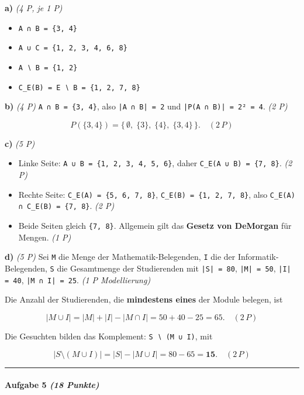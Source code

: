 \documentclass[11pt, a4paper]{article}
\begin{document}
\textbf{a)} \textit{(4 P, je 1 P)}

\begin{itemize}
  \item \texttt{A ∩ B = \{3, 4\}}
  \item \texttt{A ∪ C = \{1, 2, 3, 4, 6, 8\}}
  \item \texttt{A ∖ B = \{1, 2\}}
  \item \texttt{C\_E(B) = E ∖ B = \{1, 2, 7, 8\}}
\end{itemize}

\textbf{b)} \textit{(4 P)} \texttt{A ∩ B = \{3, 4\}}, also \texttt{|A ∩ B| = 2} und \texttt{|P(A ∩ B)| = 2² = 4}. \textit{(2 P)}

\[
P(\{3,4\}) = \{\,\emptyset,\; \{3\},\; \{4\},\; \{3, 4\}\,\}. \quad (2\,P)
\]


\textbf{c)} \textit{(5 P)}

\begin{itemize}
  \item Linke Seite: \texttt{A ∪ B = \{1, 2, 3, 4, 5, 6\}}, daher \texttt{C\_E(A ∪ B) = \{7, 8\}}. \textit{(2 P)}
  \item Rechte Seite: \texttt{C\_E(A) = \{5, 6, 7, 8\}}, \texttt{C\_E(B) = \{1, 2, 7, 8\}}, also \texttt{C\_E(A) ∩ C\_E(B) = \{7, 8\}}. \textit{(2 P)}
  \item Beide Seiten gleich \texttt{\{7, 8\}}. Allgemein gilt das \textbf{Gesetz von DeMorgan} für Mengen. \textit{(1 P)}
\end{itemize}

\textbf{d)} \textit{(5 P)} Sei \texttt{M} die Menge der Mathematik-Belegenden, \texttt{I} die der Informatik-Belegenden, \texttt{S} die Gesamtmenge der Studierenden mit \texttt{|S| = 80}, \texttt{|M| = 50}, \texttt{|I| = 40}, \texttt{|M ∩ I| = 25}. \textit{(1 P Modellierung)}


Die Anzahl der Studierenden, die \textbf{mindestens eines} der Module belegen, ist

\[
|M \cup I| = |M| + |I| - |M \cap I| = 50 + 40 - 25 = 65. \quad(2\,P)
\]


Die Gesuchten bilden das Komplement: \texttt{S ∖ (M ∪ I)}, mit

\[
|S \setminus (M \cup I)| = |S| - |M \cup I| = 80 - 65 = \mathbf{15}. \quad(2\,P)
\]



\noindent\textcolor{rulegray}{\rule{\linewidth}{0.4pt}}


\paragraph{Aufgabe 5 \textit{(18 Punkte)}}\mbox{}\\[2pt]
\end{document}
